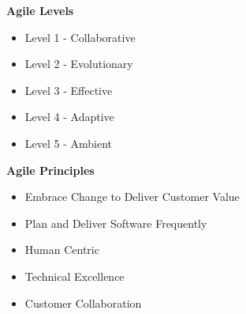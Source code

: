 \begin{minipage}[t]{0.35\linewidth}
    \textbf{Agile Levels}
    \begin{itemize}
    \item{Level 1 - Collaborative}
    \item{Level 2 - Evolutionary}
    \item{Level 3 - Effective}
    \item{Level 4 - Adaptive}
    \item{Level 5 - Ambient}
    \end{itemize}
    \end{minipage}
    \begin{minipage}[t]{0.6\linewidth}
    \textbf{Agile Principles}
    \begin{itemize}
    \item{Embrace Change to Deliver Customer Value}
    \item{Plan and Deliver Software Frequently}
    \item{Human Centric}
    \item{Technical Excellence}
    \item{Customer Collaboration}
    \end{itemize}
\end{minipage}

